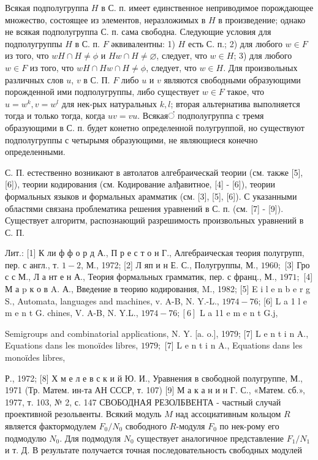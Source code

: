 \documentclass[10pt]{article}
\begin{document}
Всякая подполугруппа $H$ в С. п. имеет единственное неприводимое порождающее множество, состоящее из элементов, неразложимых в $H$ в произведение; однако не всякая подполугруппа С. п. сама свободна. Следующие условия для подполугруппы $H$ в С. п. $F$ әквивалентны: 1) $H$ есть С. п.; 2) для любого $w \in F$ из того, что $w H \cap H \neq \phi$ и $H w \cap H \neq \varnothing$, следует, что $w \in H$; 3) для любого $w \in F$ из того, что $w H \cap H w \cap H \neq \phi$, следует, что $w \in H$. Для произвольных различных слов $u$, $v$ в С. П. $F$ либо $u$ и $v$ являются свободными образующими порожденной ими подполугруппы, либо существует $w \in F$ такое, что $u=w^{k}, v=w^{l}$ для нек-рых натуральных $k, l$; вторая альтернатива выполняется тогда и только тогда, когда $u v=v u$. Всякаяं подполугруппа с тремя образующими в С. п. будет конетно определенной полугруппой, но существуют подполугруппы с четырымя образующими, не являющиеся конечно определенными.



С. П. естественно возникают в автолатов алгебраическай теории (см. также [5], [6]), теории кодирования (см. Кодирование алђавитное, [4] - [6]), теории формальных языков и формальных арамматик (см. [3], [5], [6]). С указанными областями связана проблематика решения уравнений в С. п. (см. [7] - [9]). Существует алгоритм, распознающий разрешимость произвольных уравнений в С. П.



Лит.: [1] К ли ф ф о р д А., П р е с т о н Г., Алгебраическая теория полугрупп, пер. с англ., т. $1-2$, М., 1972; [2] Л яп и н Е. С., Полугруппы, М., $1960 ;$ [3] Гро с с М., Л а нт е н А., Теория формальных грамматик, пер. с франц., М., $1971 ;$ [4] М а p к о в A. А., Введение в теорию кодирования, M., 1982; [5] E i l e n b e r g S., Automata, languages and machines, v. A-B, N. Y.-L., $1974-76$; [6] L a 1 l e m e n t G. chines, V. A-B, N. Y.L., $1974-76 ;[6]$ L a 11 e m e n t G.j,

Semigroups and combinatorial applications, N. Y. [a. o.], 1979; [7] L e n t i n A., Equations dans les monoïdes libres, $1979 ;$ [7] L e n t i n A., Equations dans les monoïdes libres,

Р., 1972; [8] Х м е л е в с к и й Ю. И., Уравнения в свободной полугруппе, М., 1971 (Тр. Матем. ин-та АН СССР, т. 107) [9] М а к а н и н Г. С., «Матем. сб.», 1977, т. 103, № 2, с. 147 СВОБОДНАЯ РЕЗОЛБВЕНТА - частный случай проективной резольвенты. Всякий модуль $M$ над ассоциативным кольцом $R$ является фактормодулем $F_{0} / N_{0}$ свободного $R$-модуля $F_{0}$ по нек-рому его подмодулю $N_{0}$. Для подмодуля $N_{0}$ существует аналогичное представление $F_{1} / N_{1}$ и т. Д. В результате получается точная последовательность свободных модулей
\end{document}
